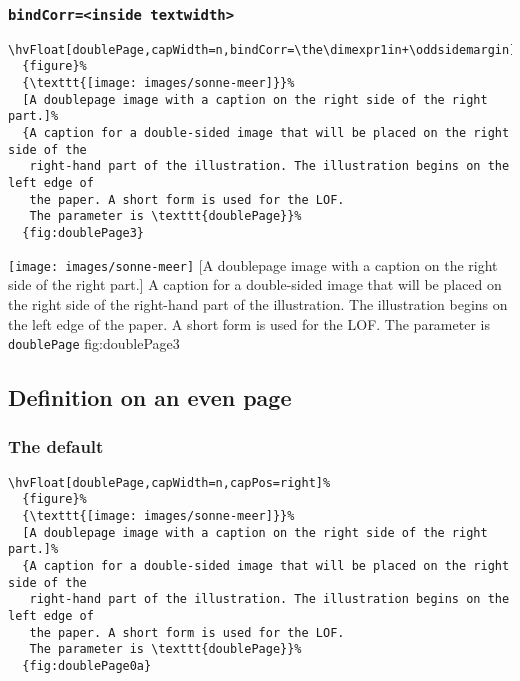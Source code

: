 \documentclass[twoside]{scrartcl}
\makeatletter
\let\hvBlindtext\Blindtext
\def\Blindtext{\par\color{black!40}\hvBlindtext\par\normalcolor}
\def\hvblindtext{\textcolor{black!40}{\blindtext@text}}
\makeatother
\begin{document}
\Blindtext

\Blindtext

\Blindtext

\hvblindtext

\subsubsection{\texttt{bindCorr=<inside textwidth>}}

\begin{lstlisting}
\hvFloat[doublePage,capWidth=n,bindCorr=\the\dimexpr1in+\oddsidemargin]%
  {figure}%
  {\texttt{[image: images/sonne-meer]}}%
  [A doublepage image with a caption on the right side of the right part.]%
  {A caption for a double-sided image that will be placed on the right side of the
   right-hand part of the illustration. The illustration begins on the left edge of 
   the paper. A short form is used for the LOF. 
   The parameter is \texttt{doublePage}}%
  {fig:doublePage3}
\end{lstlisting}

%
  {\texttt{[image: images/sonne-meer]}}%
  [A doublepage image with a caption on the right side of the right part.]%
  {A caption for a double-sided image that will be placed on the right side of the
   right-hand part of the illustration. The illustration begins on the left edge of 
   the paper. A short form is used for the LOF. 
   The parameter is \texttt{doublePage}}%
  {fig:doublePage3}


\Blindtext

\hvblindtext

\hvblindtext
\hvblindtext

\subsection{Definition on an even page}

\subsubsection{The default}
\begin{lstlisting}
\hvFloat[doublePage,capWidth=n,capPos=right]%
  {figure}%
  {\texttt{[image: images/sonne-meer]}}%
  [A doublepage image with a caption on the right side of the right part.]%
  {A caption for a double-sided image that will be placed on the right side of the
   right-hand part of the illustration. The illustration begins on the left edge of 
   the paper. A short form is used for the LOF. 
   The parameter is \texttt{doublePage}}%
  {fig:doublePage0a}
\end{lstlisting}
\end{document}
